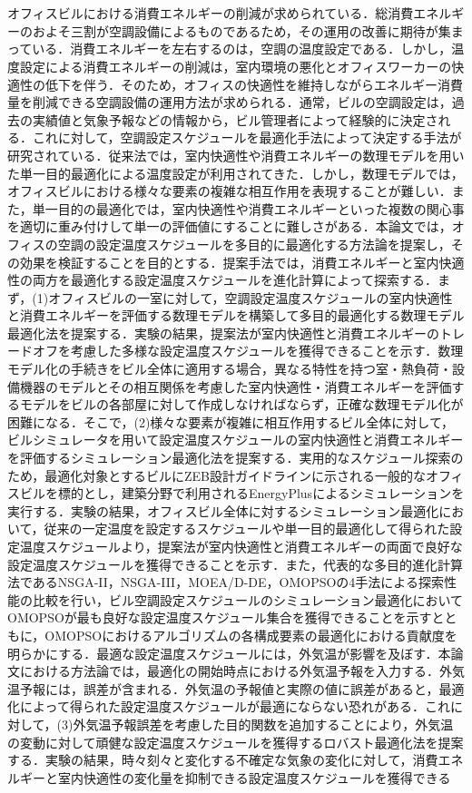 \documentclass[a4paper, 12pt,dvipdfmx]{jsbook}
\begin{document}
\clearpage
{\Huge {}}\\
\\
\hspace{1zw}
オフィスビルにおける消費エネルギーの削減が求められている．総消費エネルギーのおよそ三割が空調設備によるものであるため，その運用の改善に期待が集まっている．消費エネルギーを左右するのは，空調の温度設定である．しかし，温度設定による消費エネルギーの削減は，室内環境の悪化とオフィスワーカーの快適性の低下を伴う．そのため，オフィスの快適性を維持しながらエネルギー消費量を削減できる空調設備の運用方法が求められる．通常，ビルの空調設定は，過去の実績値と気象予報などの情報から，ビル管理者によって経験的に決定される．これに対して，空調設定スケジュールを最適化手法によって決定する手法が研究されている．従来法では，室内快適性や消費エネルギーの数理モデルを用いた単一目的最適化による温度設定が利用されてきた．しかし，数理モデルでは，オフィスビルにおける様々な要素の複雑な相互作用を表現することが難しい．また，単一目的の最適化では，室内快適性や消費エネルギーといった複数の関心事を適切に重み付けして単一の評価値にすることに難しさがある．本論文では，オフィスの空調の設定温度スケジュールを多目的に最適化する方法論を提案し，その効果を検証することを目的とする．提案手法では，消費エネルギーと室内快適性の両方を最適化する設定温度スケジュールを進化計算によって探索する．まず，(1)オフィスビルの一室に対して，空調設定温度スケジュールの室内快適性と消費エネルギーを評価する数理モデルを構築して多目的最適化する数理モデル最適化法を提案する．実験の結果，提案法が室内快適性と消費エネルギーのトレードオフを考慮した多様な設定温度スケジュールを獲得できることを示す．数理モデル化の手続きをビル全体に適用する場合，異なる特性を持つ室・熱負荷・設備機器のモデルとその相互関係を考慮した室内快適性・消費エネルギーを評価するモデルをビルの各部屋に対して作成しなければならず，正確な数理モデル化が困難になる．そこで，(2)様々な要素が複雑に相互作用するビル全体に対して，ビルシミュレータを用いて設定温度スケジュールの室内快適性と消費エネルギーを評価するシミュレーション最適化法を提案する．実用的なスケジュール探索のため，最適化対象とするビルにZEB設計ガイドラインに示される一般的なオフィスビルを標的とし，建築分野で利用されるEnergyPlusによるシミュレーションを実行する．実験の結果，オフィスビル全体に対するシミュレーション最適化において，従来の一定温度を設定するスケジュールや単一目的最適化して得られた設定温度スケジュールより，提案法が室内快適性と消費エネルギーの両面で良好な設定温度スケジュールを獲得できることを示す．また，代表的な多目的進化計算法であるNSGA-II，NSGA-III，MOEA/D-DE，OMOPSOの4手法による探索性能の比較を行い，ビル空調設定スケジュールのシミュレーション最適化においてOMOPSOが最も良好な設定温度スケジュール集合を獲得できることを示すとともに，OMOPSOにおけるアルゴリズムの各構成要素の最適化における貢献度を明らかにする．最適な設定温度スケジュールには，外気温が影響を及ぼす．本論文における方法論では，最適化の開始時点における外気温予報を入力する．外気温予報には，誤差が含まれる．外気温の予報値と実際の値に誤差があると，最適化によって得られた設定温度スケジュールが最適にならない恐れがある．これに対して，(3)外気温予報誤差を考慮した目的関数を追加することにより，外気温の変動に対して頑健な設定温度スケジュールを獲得するロバスト最適化法を提案する．実験の結果，時々刻々と変化する不確定な気象の変化に対して，消費エネルギーと室内快適性の変化量を抑制できる設定温度スケジュールを獲得できる
\end{document}
